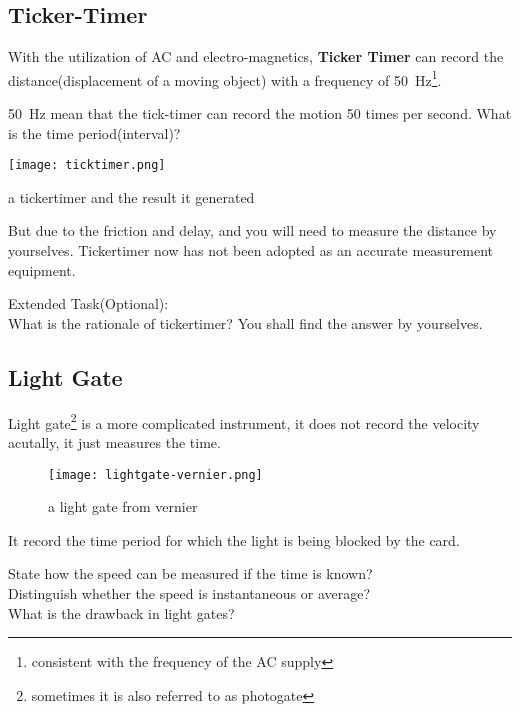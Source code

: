 \documentclass[a4paper]{tufte-handout}
\newenvironment{TaskBox} %
{\begin{tcolorbox}[breakable,colback=b1!30,colframe=b1,title=Task]} {\end{tcolorbox}}
\begin{document}
\subsection{Ticker-Timer}
With the utilization of AC and electro-magnetics, \textbf{Ticker Timer} can record the distance(displacement of a moving object) with a frequency of \SI{50}{\hertz}\footnote{consistent with the frequency of the AC supply}.
\begin{TaskBox}
\SI{50}{\hertz} mean that the tick-timer can record the motion 50 times per second. What is the time period(interval)? 
\vspace{0.1 in}
\end{TaskBox}
\begin{marginfigure}
\texttt{[image: ticktimer.png]}
\caption{a tickertimer and the result it generated}
\end{marginfigure}
But due to the friction and delay, and you will need to measure the distance by yourselves. Tickertimer now has not been adopted as an accurate measurement equipment.
\begin{TaskBox}
Extended Task(Optional):\\
What is the rationale of tickertimer? You shall find the answer by yourselves. 
\end{TaskBox}

\subsection{Light Gate}
Light gate\footnote{sometimes it is also referred to as photogate} is a more complicated instrument, it does not record the velocity acutally, it just measures the time.
\begin{figure}
\texttt{[image: lightgate-vernier.png]}
\caption{a light gate from vernier}
\end{figure}
It record the time period for which the light is being blocked by the card.
\begin{TaskBox}
State how the speed can be measured if the time is known?\\
Distinguish whether the speed is instantaneous or average?\\
What is the drawback in light gates?
\end{TaskBox}
\end{document}
